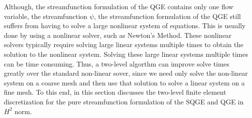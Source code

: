 Although, the streamfunction formulation of the QGE contains only one flow variable, the
streamfunction $\psi$, the streamfunction formulation of the QGE still suffers from having to solve
a large nonlinear system of equations. This is usually done by using a nonlinear solver, such as
Newton's Method. These nonlinear solvers typically require solving large linear systems multiple
times to obtain the solution to the nonlinear system. Solving these large linear systems multiple
times can be time consuming. Thus, a two-level algorthm can improve solve times greatly over the
standard non-linear sover, since we need only solve the non-linear system on a coarse mesh and then
use that solution to solve a linear system on a fine mesh. To this end, in this section discusses
the two-level finite element discretization for the pure streamfunction formulation of the SQGE and
QGE in $H^2$ norm.
